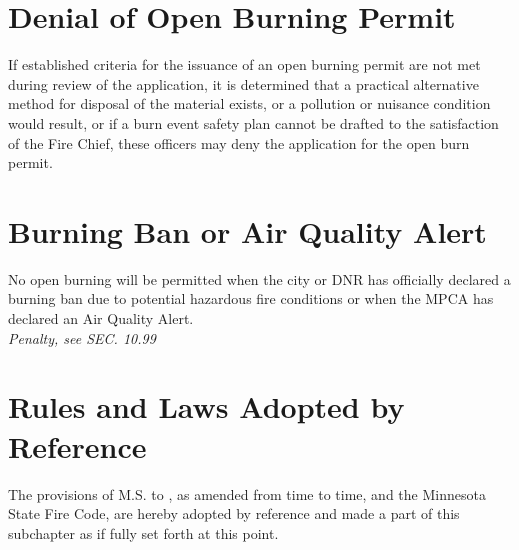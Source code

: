 \documentclass[code.tex]{subfiles}
\begin{document}
\section{Denial of Open Burning Permit}
If established criteria for the issuance of an open burning permit are not met during review of the application, it is determined that a practical alternative method for disposal of the material exists, or a pollution or nuisance condition would result, or if a burn event safety plan cannot be drafted to the satisfaction of the Fire Chief, these officers may deny the application for the open burn permit.
\section{Burning Ban or Air Quality Alert}
No open burning  will be permitted when the city or DNR has officially declared a burning ban due to potential hazardous fire conditions or when the MPCA has declared an Air Quality Alert.\\
\emph{Penalty, see SEC. 10.99}
\section{Rules and Laws Adopted by Reference}
The provisions of M.S.  to , as amended from time to time, and the Minnesota State Fire Code, are hereby adopted by reference and made a part of this subchapter as if fully set forth at this point.
\end{document}

